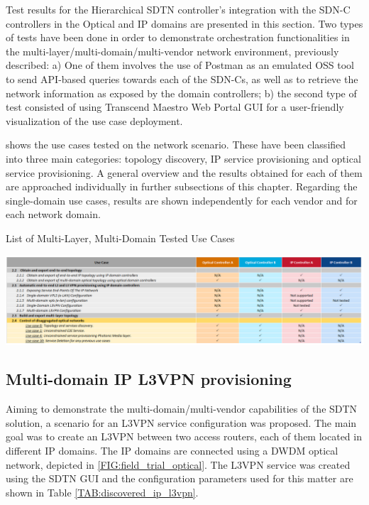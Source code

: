 \documentclass[a4paper,fleqn]{cas-dc}
\begin{document}
Test results for the Hierarchical SDTN controller’s integration with the  SDN-C controllers in the Optical and IP domains are presented in this section. Two types of tests have been done in order to demonstrate orchestration functionalities in the multi-layer/multi-domain/multi-vendor network environment, previously described: a) One of them involves the use of Postman as an emulated OSS tool to send API-based queries towards each of the SDN-Cs, as well as to retrieve the network information as exposed by the domain controllers; b) the second type of test consisted of using Transcend Maestro Web Portal GUI for a user-friendly visualization of the use case deployment.

 shows the use cases tested on the network scenario. These have been classified into three main categories: topology discovery, IP service provisioning and optical service provisioning. A general overview and the results obtained for each of them are approached individually in further subsections of this chapter. Regarding the single-domain use cases, results are shown independently for each vendor and for each network domain.

\begin{table}
	\caption{List of Multi-Layer, Multi-Domain Tested Use Cases}
	\centering
		\includegraphics[scale=0.5]{figs/tested_use_cases.png}
	\label{TAB:tested_use_cases}
\end{table}

\subsection{Multi-domain IP L3VPN provisioning}

Aiming to demonstrate the multi-domain/multi-vendor capabilities of the SDTN solution, a scenario for an L3VPN service configuration was proposed. The main goal was to create an L3VPN between two access routers, each of them located in different IP domains. The IP domains are connected using a DWDM optical network, depicted in \cref{FIG:field_trial_optical}. The L3VPN service was created using the SDTN GUI and the configuration parameters used for this matter are shown in Table \cref{TAB:discovered_ip_l3vpn}.
\end{document}
